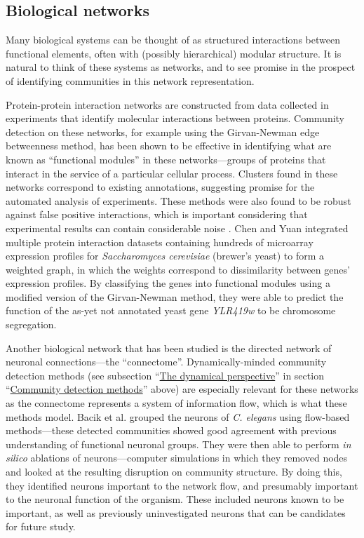 \hypertarget{biological-networks}{\subsection{Biological
networks}\label{biological-networks}}

Many biological systems can be thought of as structured interactions
between functional elements, often with (possibly hierarchical) modular
structure. It is natural to think of these systems as networks, and to
see promise in the prospect of identifying communities in this network
representation.

Protein-protein interaction networks are constructed from data collected
in experiments that identify molecular interactions between proteins.
Community detection on these networks, for example using the
Girvan-Newman edge betweenness method, has been shown to be effective in
identifying what are known as ``functional modules'' in these
networks---groups of proteins that interact in the service of a
particular cellular process. Clusters found in these networks correspond
to existing annotations, suggesting promise for the automated analysis
of experiments. These methods were also found to be robust against false
positive interactions, which is important considering that experimental
results can contain considerable noise \autocite{dunn_use_2005}. Chen
and Yuan \autocite{chen_detecting_2006} integrated multiple protein
interaction datasets containing hundreds of microarray expression
profiles for \emph{Saccharomyces cerevisiae} (brewer's yeast) to form a
weighted graph, in which the weights correspond to dissimilarity between
genes' expression profiles. By classifying the genes into functional
modules using a modified version of the Girvan-Newman method, they were
able to predict the function of the as-yet not annotated yeast gene
\emph{YLR419w} to be chromosome segregation.

Another biological network that has been studied is the directed network
of neuronal connections---the ``connectome''. Dynamically-minded
community detection methods (see subsection
``\protect\hyperlink{the-dynamical-perspective}{The dynamical
perspective}'' in section
``\protect\hyperlink{community-detection-methods}{Community detection
methods}'' above) are especially relevant for these networks as the
connectome represents a system of information flow, which is what these
methods model. Bacik et al. \autocite{bacik_flow-based_2016} grouped the
neurons of \emph{C. elegans} using flow-based methods---these detected
communities showed good agreement with previous understanding of
functional neuronal groups. They were then able to perform \emph{in
silico} ablations of neurons---computer simulations in which they
removed nodes and looked at the resulting disruption on community
structure. By doing this, they identified neurons important to the
network flow, and presumably important to the neuronal function of the
organism. These included neurons known to be important, as well as
previously uninvestigated neurons that can be candidates for future
study.

